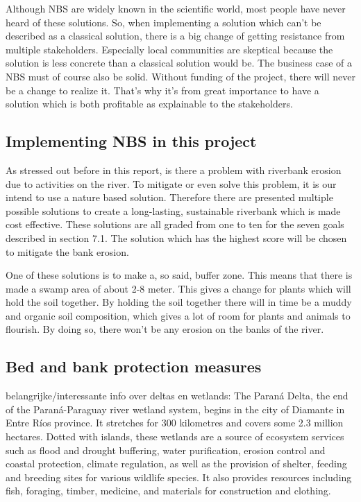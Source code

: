 Although NBS are widely known in the scientific world, most people have never heard of these solutions. So, when implementing a solution which can't be described as a classical solution, there is a big change of getting resistance from multiple stakeholders. Especially local communities are skeptical because the solution is less concrete than a classical solution would be. The business case of a NBS must of course also be solid. Without funding of the project, there will never be a change to realize it. That's why it's from great importance to have a solution which is both profitable as explainable to the stakeholders. 

\subsection{Implementing NBS in this project}

As stressed out before in this report, is there a problem with riverbank erosion due to activities on the river. To mitigate or even solve this problem, it is our intend to use a nature based solution. Therefore there are presented multiple possible solutions to create a long-lasting, sustainable riverbank which is made cost effective. These solutions are all graded from one to ten for the seven goals described in section 7.1. The solution which has the highest score will be chosen to mitigate the bank erosion.

One of these solutions is to make a, so said, buffer zone. This means that there is made a swamp area of about 2-8 meter. This gives a change for plants which will hold the soil together. By holding the soil together there will in time be a muddy and organic soil composition, which gives a lot of room for plants and animals to flourish. By doing so, there won't be any erosion on the banks of the river. 


\subsection{Bed and bank protection measures}

belangrijke/interessante info over deltas en wetlands:
The Paraná Delta, the end of the Paraná-Paraguay river wetland system, begins in the city of Diamante in Entre Ríos province. It stretches for 300 kilometres and covers some 2.3 million hectares. Dotted with islands, these wetlands are a source of ecosystem services such as flood and drought buffering, water purification, erosion control and coastal protection, climate regulation, as well as the provision of shelter, feeding and breeding sites for various wildlife species. It also provides resources including fish, foraging, timber, medicine, and materials for construction and clothing.

